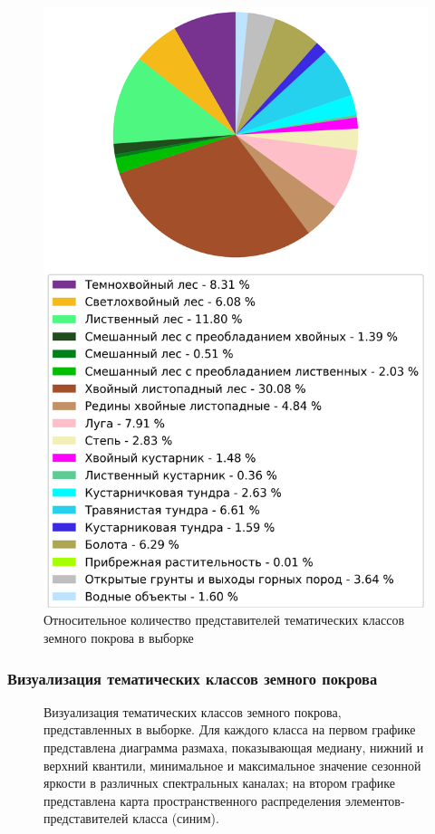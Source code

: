 \documentclass[14pt, a4paper, oneside]{extarticle}
\begin{document}
\begin{figure}[H]
    \caption{Относительное количество представителей тематических классов земного покрова в выборке}
    \centering
    \includegraphics[scale=0.8]{classes-ratio}
\end{figure}

\subsubsection{Визуализация тематических классов земного покрова}
\begin{figure}[H]
    \caption{Визуализация тематических классов земного покрова, представленных в выборке. Для каждого класса на первом графике представлена диаграмма размаха, показывающая медиану, нижний и верхний квантили, минимальное и максимальное значение сезонной яркости в различных спектральных каналах; на втором графике представлена карта пространственного распределения элементов-представителей класса (синим).}
\end{figure}
\end{document}
